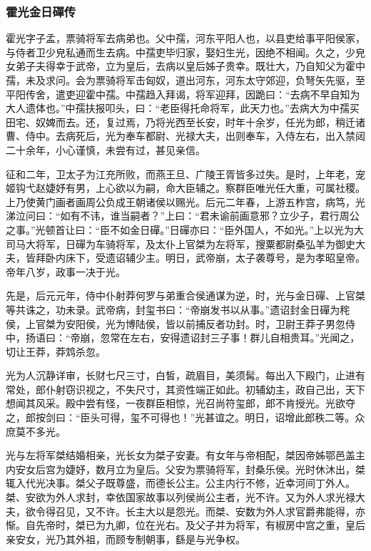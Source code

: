 \documentclass[]{article}
\begin{document}
\hypertarget{header-n5032}{%
\subsubsection{霍光金日磾传}\label{header-n5032}}

霍光字子孟，票骑将军去病弟也。父中孺，河东平阳人也，以县吏给事平阳侯家，与侍者卫少皃私通而生去病。中孺吏毕归家，娶妇生光，因绝不相闻。久之，少皃女弟子夫得幸于武帝，立为皇后，去病以皇后姊子贵幸。既壮大，乃自知父为霍中孺，未及求问。会为票骑将军击匈奴，道出河东，河东太守郊迎，负弩矢先驱，至平阳传舍，遣吏迎霍中孺。中孺趋入拜谒，将军迎拜，因跪曰：``去病不早自知为大人遗体也。''中孺扶报叩头，曰：``老臣得托命将军，此天力也。''去病大为中孺买田宅、奴婢而去。还，复过焉，乃将光西至长安，时年十余岁，任光为郎，稍迁诸曹、侍中。去病死后，光为奉车都尉、光禄大夫，出则奉车，入侍左右，出入禁闼二十余年，小心谨慎，未尝有过，甚见亲信。

征和二年，卫太子为江充所败，而燕王旦、广陵王胥皆多过失。是时，上年老，宠姬钩弋赵婕妤有男，上心欲以为嗣，命大臣辅之。察群臣唯光任大重，可属社稷。上乃使黄门画者画周公负成王朝诸侯以赐光。后元二年春，上游五柞宫，病笃，光涕泣问曰：``如有不讳，谁当嗣者？''上曰：``君未谕前画意邪？立少子，君行周公之事。''光顿首让曰：``臣不如金日磾。''日磾亦曰：``臣外国人，不如光。''上以光为大司马大将军，日磾为车骑将军，及太仆上官桀为左将军，搜粟都尉桑弘羊为御史大夫，皆拜卧内床下，受遗诏辅少主。明日，武帝崩，太子袭尊号，是为孝昭皇帝。帝年八岁，政事一决于光。

先是，后元元年，侍中仆射莽何罗与弟重合侯通谋为逆，时，光与金日磾、上官桀等共诛之，功未录。武帝病，封玺书曰：``帝崩发书以从事。''遗诏封金日磾为秺侯，上官桀为安阳侯，光为博陆侯，皆以前捕反者功封。时，卫尉王莽子男忽侍中，扬语曰：``帝崩，忽常在左右，安得遗诏封三子事！群儿自相贵耳。''光闻之，切让王莽，莽鸩杀忽。

光为人沉静详审，长财七尺三寸，白皙，疏眉目，美须髯。每出入下殿门，止进有常处，郎仆射窃识视之，不失尺寸，其资性端正如此。初辅幼主，政自己出，天下想闻其风采。殿中尝有怪，一夜群臣相惊，光召尚符玺郎，郎不肯授光。光欲夺之，郎按剑曰：``臣头可得，玺不可得也！''光甚谊之。明日，诏增此郎秩二等。众庶莫不多光。

光与左将军桀结婚相亲，光长女为桀子安妻。有女年与帝相配，桀因帝姊鄂邑盖主内安女后宫为婕妤，数月立为皇后。父安为票骑将军，封桑乐侯。光时休沐出，桀辄入代光决事。桀父子既尊盛，而德长公主。公主内行不修，近幸河间丁外人。桀、安欲为外人求封，幸依国家故事以列侯尚公主者，光不许。又为外人求光禄大夫，欲令得召见，又不许。长主大以是怨光。而桀、安数为外人求官爵弗能得，亦惭。自先帝时，桀已为九卿，位在光右。及父子并为将军，有椒房中宫之重，皇后亲安女，光乃其外祖，而顾专制朝事，繇是与光争权。
\end{document}
